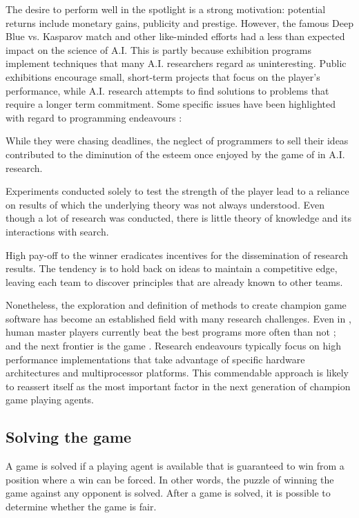 The desire to perform well in the spotlight is a strong motivation:  potential returns include monetary gains, publicity and prestige. 
However, the famous Deep Blue vs. Kasparov match and other like-minded efforts had a less than expected  impact on the science of A.I.  This is partly because exhibition programs  implement techniques that many A.I. researchers regard as uninteresting.  Public exhibitions encourage small, short-term projects that focus on the player's performance, while A.I. research attempts  to find  solutions to problems that require a longer term commitment.  Some specific issues have been highlighted with regard to  programming endeavours  
\cite{donskoy:grace}:
\begin{mydesclist}
\item While they were chasing deadlines, the neglect of  programmers to sell their ideas contributed to the diminution of the esteem once enjoyed by the game of  in A.I. research.
\item Experiments conducted solely to test the strength of the player lead to a reliance on results of which the underlying theory was not always understood.  Even though a lot of research was conducted, there is little theory of  knowledge and its interactions with search.
\item High pay-off to the winner eradicates incentives for the dissemination of research results.  The tendency is to hold back on ideas to maintain a competitive edge, leaving each team to discover principles that are already known to other teams.
\end{mydesclist}

Nonetheless, the exploration and definition of methods to create champion game software has become an established field with many research challenges. Even in ,  human master players currently beat the best  programs more often than not \cite{sonas:strongest}; and the next frontier is the game . Research endeavours typically focus on high performance implementations that take advantage of specific hardware architectures and multiprocessor platforms. This commendable approach is likely to reassert itself as the most important factor in the next generation of champion game playing agents.

\subsection{Solving the game}
\label{sec:solving}
A game is solved if a playing agent is available that is guaranteed to win from a position where a win can be forced.  In other words, the puzzle of winning the game against any opponent is solved.  After a game is solved, it is possible to determine whether the game is fair. 

